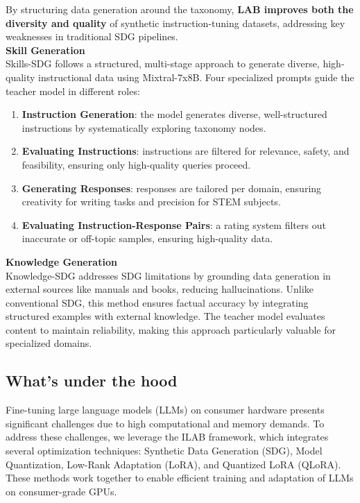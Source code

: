 \documentclass[12pt]{article}
\begin{document}
By structuring data generation around the taxonomy, \textbf{LAB improves both the diversity and quality} of synthetic instruction-tuning datasets, addressing key weaknesses in traditional SDG pipelines.\vspace{14pt}\\
\textbf{Skill Generation}\\
Skills-SDG follows a structured, multi-stage approach to generate diverse, high-quality instructional data using Mixtral-7x8B. Four specialized prompts guide the teacher model in different roles:  
\begin{enumerate}  
    \item \textbf{Instruction Generation}: the model generates diverse, well-structured instructions by systematically exploring taxonomy nodes.  
    \item \textbf{Evaluating Instructions}: instructions are filtered for relevance, safety, and feasibility, ensuring only high-quality queries proceed.  
    \item \textbf{Generating Responses}: responses are tailored per domain, ensuring creativity for writing tasks and precision for STEM subjects.  
    \item \textbf{Evaluating Instruction-Response Pairs}: a rating system filters out inaccurate or off-topic samples, ensuring high-quality data.  
\end{enumerate}
\textbf{Knowledge Generation}\\
Knowledge-SDG addresses SDG limitations by grounding data generation in external sources like manuals and books, reducing hallucinations. Unlike conventional SDG, this method ensures factual accuracy by integrating structured examples with external knowledge. The teacher model evaluates content to maintain reliability, making this approach particularly valuable for specialized domains.  

\subsection{What's under the hood}
Fine-tuning large language models (LLMs) on consumer hardware presents significant challenges due to high computational and memory demands. To address these challenges, we leverage the ILAB framework, which integrates several optimization techniques: Synthetic Data Generation (SDG), Model Quantization, Low-Rank Adaptation (LoRA\cite{hu2021loralowrankadaptationlarge}), and Quantized LoRA (QLoRA\cite{dettmers2023qloraefficientfinetuningquantized}). These methods work together to enable efficient training and adaptation of LLMs on consumer-grade GPUs.
\end{document}
